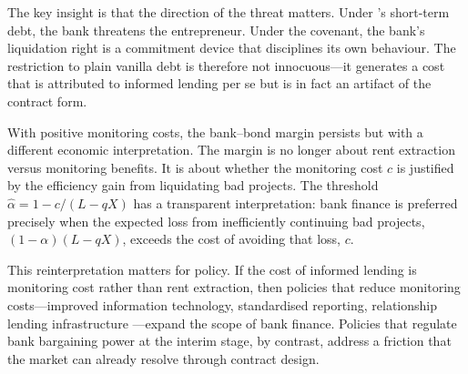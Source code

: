 \documentclass[12pt,a4paper]{article}
\theoremstyle{plain}
\theoremstyle{definition}
\theoremstyle{remark}
\begin{document}
The key insight is that the direction of the threat matters. Under \citeauthor{rajan1992}'s short-term debt, the bank threatens the entrepreneur. Under the covenant, the bank's liquidation right is a commitment device that disciplines its own behaviour. The restriction to plain vanilla debt is therefore not innocuous---it generates a cost that is attributed to informed lending per se but is in fact an artifact of the contract form.

With positive monitoring costs, the bank--bond margin persists but with a different economic interpretation. The margin is no longer about rent extraction versus monitoring benefits. It is about whether the monitoring cost $c$ is justified by the efficiency gain from liquidating bad projects. The threshold $\hat{\alpha} = 1 - c/(L - qX)$ has a transparent interpretation: bank finance is preferred precisely when the expected loss from inefficiently continuing bad projects, $(1-\alpha)(L - qX)$, exceeds the cost of avoiding that loss, $c$.

This reinterpretation matters for policy. If the cost of informed lending is monitoring cost rather than rent extraction, then policies that reduce monitoring costs---improved information technology, standardised reporting, relationship lending infrastructure \citep{bolton2016, holmstromtirole1997}---expand the scope of bank finance. Policies that regulate bank bargaining power at the interim stage, by contrast, address a friction that the market can already resolve through contract design.



\end{document}
